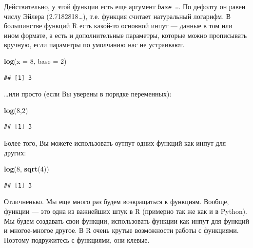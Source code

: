\documentclass[]{book}
\newenvironment{Shaded}{\begin{snugshade}}{\end{snugshade}}
\newcommand{\KeywordTok}[1]{\textcolor[rgb]{0.13,0.29,0.53}{\textbf{#1}}}
\newcommand{\DataTypeTok}[1]{\textcolor[rgb]{0.13,0.29,0.53}{#1}}
\newcommand{\DecValTok}[1]{\textcolor[rgb]{0.00,0.00,0.81}{#1}}
\newcommand{\NormalTok}[1]{#1}
\begin{document}
Действительно, у этой функции есть еще аргумент \emph{\texttt{base\ =}}.
По дефолту он равен числу Эйлера (2.7182818\ldots{}), т.е. функция
считает натуральный логарифм. В большинстве функций R есть какой-то
основной инпут --- данные в том или ином формате, а есть и
дополнительные параметры, которые можно прописывать вручную, если
параметры по умолчанию нас не устраивают.

\begin{Shaded}
\begin{Highlighting}[]
\KeywordTok{log}\NormalTok{(}\DataTypeTok{x =} \DecValTok{8}\NormalTok{, }\DataTypeTok{base =} \DecValTok{2}\NormalTok{)}
\end{Highlighting}
\end{Shaded}

\begin{verbatim}
## [1] 3
\end{verbatim}

\ldots{}или просто (если Вы уверены в порядке переменных):

\begin{Shaded}
\begin{Highlighting}[]
\KeywordTok{log}\NormalTok{(}\DecValTok{8}\NormalTok{,}\DecValTok{2}\NormalTok{)}
\end{Highlighting}
\end{Shaded}

\begin{verbatim}
## [1] 3
\end{verbatim}

Более того, Вы можете использовать оутпут одних функций как инпут для
других:

\begin{Shaded}
\begin{Highlighting}[]
\KeywordTok{log}\NormalTok{(}\DecValTok{8}\NormalTok{, }\KeywordTok{sqrt}\NormalTok{(}\DecValTok{4}\NormalTok{))}
\end{Highlighting}
\end{Shaded}

\begin{verbatim}
## [1] 3
\end{verbatim}

Отличненько. Мы еще много раз будем возвращаться к функциям. Вообще,
функции --- это одна из важнейших штук в R (примерно так же как и в
Python). Мы будем создавать свои функции, использовать функции как инпут
для функций и многое-многое другое. В R очень крутые возможности работы
с функциями. Поэтому подружитесь с функциями, они клевые.
\end{document}
